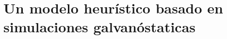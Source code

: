 \chapter{Un modelo heurístico basado en simulaciones galvanóstaticas}\label{ch:un}
\thispagestyle{empty}






% 
% 
